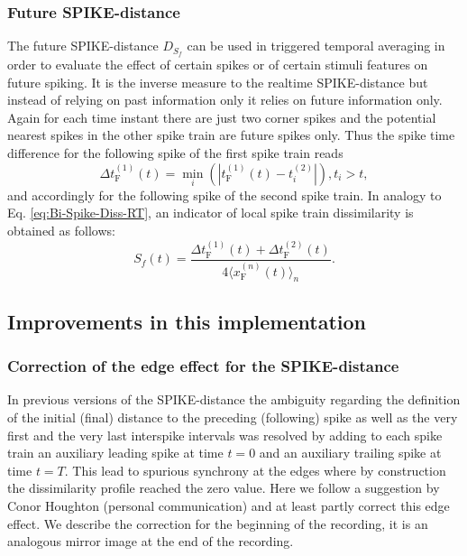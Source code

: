 \documentclass[10pt,twocolumn]{elsart5p}
\begin{document}
\subsubsection{\label{sss:Future-Spike-Distance} Future SPIKE-distance}

The future SPIKE-distance $D_{S_f}$ can be used in triggered temporal averaging in order to evaluate the effect of certain spikes or of certain stimuli features on future spiking. It is the inverse measure to the realtime SPIKE-distance but instead of relying on past information only it relies on future information only. Again for each time instant there are just two corner spikes and the potential nearest spikes in the other spike train are future spikes only. Thus the spike time difference for the following spike of the first spike train reads
%
\begin{equation} \label{eq:Delta-Corner-Spike-Future}
     \Delta t_{\mathrm {F}}^{(1)} (t) = \min_i (| t_{\mathrm {F}}^{(1)} (t) - t_i^{(2)} |), t_i > t,
\end{equation}
%
and accordingly for the following spike of the second spike train. In analogy to Eq. \ref{eq:Bi-Spike-Diss-RT}, an indicator of local spike train dissimilarity is obtained as follows:
%
\begin{equation} \label{eq:Bi-Spike-Diss-FT}
    S_f (t) = \frac{ \Delta t_{\mathrm {F}}^{(1)} (t) + \Delta t_{\mathrm {F}}^{(2)} (t)} {4 \langle x_{\mathrm {F}}^{(n)} (t) \rangle_n}.
\end{equation}	




\subsection{\label{ss:Improvements} Improvements in this implementation}

\subsubsection{\label{sss:Edge-effect} Correction of the edge effect for the SPIKE-distance}

In previous versions of the SPIKE-distance the ambiguity regarding the definition of the initial (final) distance to the preceding (following) spike as well as the very first and the very last interspike intervals was resolved by adding to each spike train an auxiliary leading spike at time $t = 0$ and an auxiliary trailing spike at time $t = T$. This lead to spurious synchrony at the edges where by construction the dissimilarity profile reached the zero value. Here we follow a suggestion by Conor Houghton (personal communication) and at least partly correct this edge effect. We describe the correction for the beginning of the recording, it is an analogous mirror image at the end of the recording.
\end{document}
